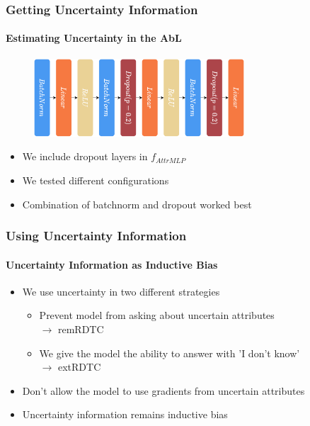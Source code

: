 \documentclass[9pt]{beamer}
\begin{document}
\begin{frame}
\frametitle{Getting Uncertainty Information}
\framesubtitle{Estimating Uncertainty in the AbL}
\begin{figure}
	\centering
	\includegraphics[width=0.7\textwidth]{images/f_attrMLP.pdf}
\end{figure}
\begin{itemize}
	\item We include dropout layers in $f_{AttrMLP}$
	\item We tested different configurations
	\item Combination of batchnorm and dropout worked best
\end{itemize}
\end{frame}



\begin{frame}	
\frametitle{Using Uncertainty Information}
\framesubtitle{Uncertainty Information as Inductive Bias}
\begin{itemize}
	\item We use uncertainty in two different strategies
	\begin{itemize}
		\item Prevent model from asking about uncertain attributes\\$\rightarrow$ remRDTC
		\item We give the model the ability to answer with 'I don't know'\\$\rightarrow$ extRDTC
	\end{itemize}
	\item Don't allow the model to use gradients from uncertain attributes
	\item Uncertainty information remains inductive bias%
\end{itemize}
\end{frame}
\end{document}
